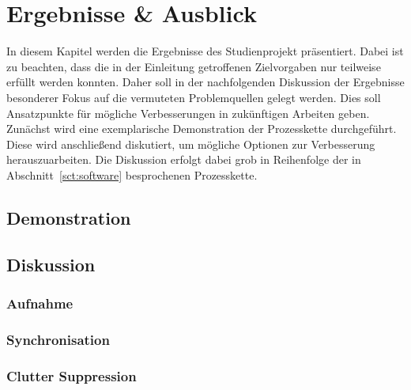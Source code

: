 \chapter{Ergebnisse \& Ausblick}

In diesem Kapitel werden die Ergebnisse des Studienprojekt präsentiert. Dabei ist zu beachten, dass die in der Einleitung getroffenen Zielvorgaben nur teilweise erfüllt werden konnten. Daher soll in der nachfolgenden Diskussion der Ergebnisse besonderer Fokus auf die vermuteten Problemquellen gelegt werden. Dies soll Ansatzpunkte für mögliche Verbesserungen in zukünftigen Arbeiten geben. Zunächst wird eine exemplarische Demonstration der Prozesskette durchgeführt. Diese wird anschließend diskutiert, um mögliche Optionen zur Verbesserung herauszuarbeiten. Die Diskussion erfolgt dabei grob in Reihenfolge der in Abschnitt~\ref{sct:software} besprochenen Prozesskette.

\section{Demonstration}

\section{Diskussion}

\subsection{Aufnahme}

\subsection{Synchronisation}

\subsection{Clutter Suppression}
